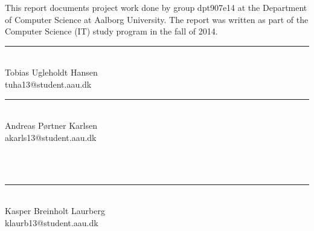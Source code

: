 \makeatletter {}\makeatother
{}
This report documents project work done by group dpt907e14 at the Department of Computer Science at Aalborg University. The report was written as part of the Computer Science (IT) study program in the fall of 2014.

\newpage
\vspace*{30 mm}
\begin{vplace}

\begin{minipage}[b]{0.45\textwidth}
 \centering
 \rule{\textwidth}{0.5pt}\\
  Tobias Ugleholdt Hansen\\
 {\footnotesize tuha13@student.aau.dk}
\end{minipage}
\begin{minipage}[b]{0.45\textwidth}
 \centering
 \rule{\textwidth}{0.5pt}\\
  Andreas Pørtner Karlsen\\
 {\footnotesize akarls13@student.aau.dk}
\end{minipage}\\\\
\begin{minipage}[b]{0.45\textwidth}
 \centering
 \rule{\textwidth}{0.5pt}\\
  Kasper Breinholt Laurberg\\
 {\footnotesize klaurb13@student.aau.dk}
\end{minipage}\\\\


\end{vplace}
\worksheetend
